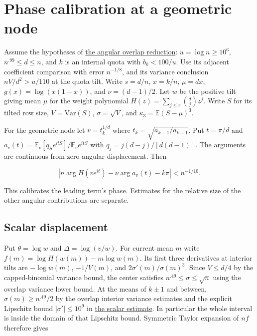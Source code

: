 \documentclass[11pt]{article}
\begin{document}
\section{Phase calibration at a geometric node}

Assume the hypotheses of \href{https://github.com/ProgramComputer/open-math-research/blob/main/topics/balanced-arrays/effective-sublinear/angular-overlap.md}{the angular overlap reduction}:
$u=\log n\ge10^6$, $n^{.99}\le d\le n$, and $k$ is an internal
quota with $b_k<100/u$. Use its adjacent coefficient comparison
with error $n^{-1/8}$, and its variance conclusion
$nV/d^2>u/110$ at the quota tilt. Write $s=d/n$, $x=k/n$,
$\mu=dx$, $g(x)=\log(x(1-x))$, and $\nu=(d-1)/2$.
Let $w$ be the positive tilt giving mean $\mu$ for the weight polynomial
$H(z)=\sum_{j\le r}\binom dj z^j$. Write $S$ for its tilted row size,
$V=\mathrm{Var}(S)$, $\sigma=\sqrt V$, and
$\kappa_3=\mathbb E(S-\mu)^3$.

For the geometric node let $v=t_k^{1/d}$ where
$t_k=\sqrt{a_{k-1}/a_{k+1}}$. Put $t=\pi/d$ and
$a_v(t)=\mathbb E_v[q_S e^{itS}]/\mathbb E_v e^{itS}$ with
$q_j=j(d-j)/[d(d-1)]$. The arguments are
continuous from zero angular displacement. Then

\[
\left|n\arg H(ve^{it})-\nu\arg a_v(t)-k\pi\right|<n^{-1/10}.
\]

This calibrates the leading term's phase. Estimates for the relative
size of the other angular contributions are separate.

\subsection{Scalar displacement}

Put $\theta=\log w$ and $\Delta=\log(v/w)$.
For current mean $m$ write $f(m)=\log H(w(m))-m\log w(m)$.
Its first three derivatives at interior tilts are
$-\log w(m)$, $-1/V(m)$, and $2\sigma'(m)/\sigma(m)^3$.
Since $V\le d/4$ by the capped-binomial variance bound,
the center satisfies $n^{.49}\le\sigma\le\sqrt n$ using the
overlap variance lower bound. At the means of $k\pm1$ and between,
$\sigma(m)\ge n^{.49}/2$ by the overlap interior variance estimates
and the explicit Lipschitz bound $|\sigma'|\le10^9$ in
\href{https://github.com/ProgramComputer/open-math-research/blob/main/topics/balanced-arrays/adjacent-quotas/scalar.md}{the scalar estimate}. In particular the whole interval is
inside the domain of that Lipschitz bound. Symmetric Taylor expansion
of $nf$ therefore gives
\end{document}
